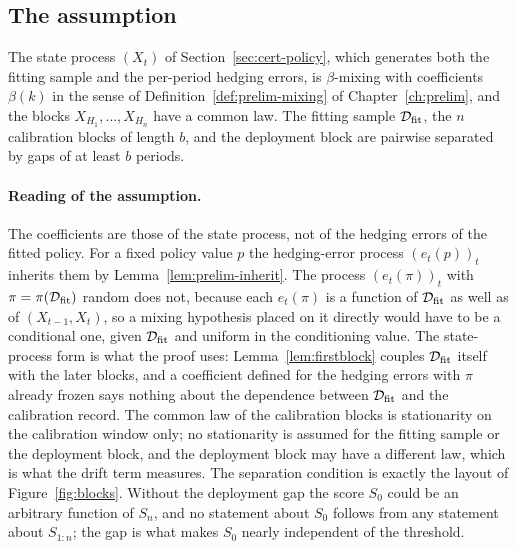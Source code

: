 \documentclass[../../../main.tex]{subfiles}
\begin{document}
\subsection{The assumption}

\begin{assumption}\label{ass:mix}
The state process $(X_t)$ of Section~\ref{sec:cert-policy}, which generates both the fitting sample and the per-period hedging errors, is $\beta$-mixing with coefficients $\beta(k)$ in the sense of Definition~\ref{def:prelim-mixing} of Chapter~\ref{ch:prelim}, and the blocks $X_{H_1},\dots,X_{H_n}$ have a common law. The fitting sample $\mathcal D_{\mathrm{fit}}$, the $n$ calibration blocks of length $b$, and the deployment block are pairwise separated by gaps of at least $b$ periods.
\end{assumption}

\paragraph{Reading of the assumption.} The coefficients are those of the state process, not of the hedging errors of the fitted policy. For a fixed policy value $p$ the hedging-error process $(e_t(p))_t$ inherits them by Lemma~\ref{lem:prelim-inherit}. The process $(e_t(\pi))_t$ with $\pi=\pi(\mathcal D_{\mathrm{fit}})$ random does not, because each $e_t(\pi)$ is a function of $\mathcal D_{\mathrm{fit}}$ as well as of $(X_{t-1},X_t)$, so a mixing hypothesis placed on it directly would have to be a conditional one, given $\mathcal D_{\mathrm{fit}}$ and uniform in the conditioning value. The state-process form is what the proof uses: Lemma~\ref{lem:firstblock} couples $\mathcal D_{\mathrm{fit}}$ itself with the later blocks, and a coefficient defined for the hedging errors with $\pi$ already frozen says nothing about the dependence between $\mathcal D_{\mathrm{fit}}$ and the calibration record. The common law of the calibration blocks is stationarity on the calibration window only; no stationarity is assumed for the fitting sample or the deployment block, and the deployment block may have a different law, which is what the drift term measures. The separation condition is exactly the layout of Figure~\ref{fig:blocks}. Without the deployment gap the score $S_0$ could be an arbitrary function of $S_n$, and no statement about $S_0$ follows from any statement about $S_{1:n}$; the gap is what makes $S_0$ nearly independent of the threshold.
\end{document}
